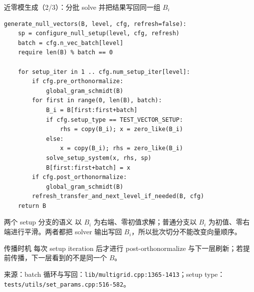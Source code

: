 \documentclass[UTF8,aspectratio=169,11pt]{ctexbeamer}
\newcommand{\source}[1]{\vspace{0.05em}\par{\raggedright\scriptsize\color{muted}来源：#1\par}}
\newcommand{\codepath}[1]{\nolinkurl{#1}}
\begin{document}
\begin{frame}[fragile,t]{近零模生成（2/3）：分批 solve 并把结果写回同一组 \(B_i\)}
  \begin{lstlisting}[firstnumber=1]
generate_null_vectors(B, level, cfg, refresh=false):
    sp = configure_null_setup(level, cfg, refresh)
    batch = cfg.n_vec_batch[level]
    require len(B) % batch == 0

    for setup_iter in 1 .. cfg.num_setup_iter[level]:
        if cfg.pre_orthonormalize:
            global_gram_schmidt(B)
        for first in range(0, len(B), batch):
            B_i = B[first:first+batch]
            if cfg.setup_type == TEST_VECTOR_SETUP:
                rhs = copy(B_i); x = zero_like(B_i)
            else:
                x = copy(B_i); rhs = zero_like(B_i)
            solve_setup_system(x, rhs, sp)
            B[first:first+batch] = x
        if cfg.post_orthonormalize:
            global_gram_schmidt(B)
        refresh_transfer_and_next_level_if_needed(B, cfg)
    return B
  \end{lstlisting}
  \vspace{0.08cm}
  \begin{block}{两个 setup 分支的语义}
    \texttt{} 以 \(B_i\) 为右端、零初值求解；普通分支以 \(B_i\) 为初值、零右端进行平滑。两者都把 solver 输出写回 \(B_i\)，所以批次切分不能改变向量顺序。
  \end{block}
  \begin{alertblock}{传播时机}
    每次 setup iteration 后才进行 post-orthonormalize 与下一层刷新；若提前传播，下一层看到的不是同一个 \(B\)。
  \end{alertblock}
  \source{batch 循环与写回：\codepath{lib/multigrid.cpp:1365-1413}；setup type：\codepath{tests/utils/set_params.cpp:516-582}。}
\end{frame}
\end{document}
